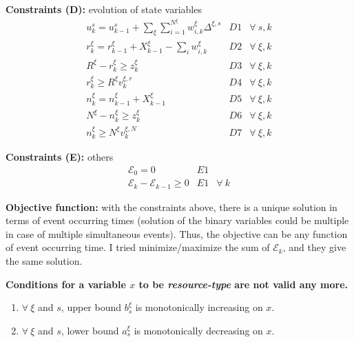 \documentclass[]{interact}
\theoremstyle{plain}%
\theoremstyle{definition}
\theoremstyle{remark}
\begin{document}
\textbf{Constraints (D):} evolution of state variables
\begin{eqnarray}
u^{s}_{k} = u^s_{k-1} + \sum_{\xi} \sum_{i=1}^{N^{\xi}} w^{\xi}_{i,k} \Delta^{\xi,s}&D1& \forall\ s,k\\
r^{\xi}_k = r^{\xi}_{k-1} + X^{\xi}_{k-1} - \sum_i w^{\xi}_{i,k} &D2& \forall\ \xi,k\\
R^{\xi} - r^{\xi}_k \ge z^{\xi}_k&D3& \forall\ \xi,k\\
r^{\xi}_k  \ge R^{\xi}v^{\xi,r}_k&D4& \forall\ \xi,k\\
n^{\xi}_k = n^{\xi}_{k-1} + X^{\xi}_{k-1} &D5& \forall\ \xi,k\\
N^{\xi} - n^{\xi}_k \ge z^{\xi}_k&D6&\forall\ \xi,k\\
n^{\xi}_k \ge N^{\xi}v^{\xi,N}_k&D7&\forall\ \xi,k
\end{eqnarray}

\textbf{Constraints (E):} others
\begin{eqnarray}
\mathcal{E}_{0} = 0&E1&\\
\mathcal{E}_{k}-\mathcal{E}_{k-1}\ge 0&E1&\forall\ k
\end{eqnarray}


\textbf{Objective function:} with the constraints above, there is a unique solution in terms of event occurring times (solution of the binary variables could be multiple in case of multiple simultaneous events). Thus, the objective can be any function of event occurring time. I tried minimize/maximize the sum of $\mathcal{E}_k$, and they give the same solution.

\textbf{Conditions for a variable $x$ to be \textit{resource-type} are not valid any more.}
\begin{enumerate}
\item $\forall\ \xi$ and $s$, upper bound $b^{\xi}_s$ is monotonically increasing on $x$.
\item  $\forall\ \xi$ and $s$, lower bound $a^{\xi}_s$ is monotonically decreasing on $x$.
\end{enumerate}
\end{document}
